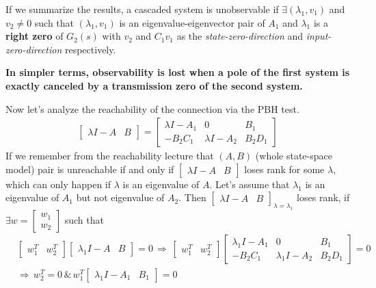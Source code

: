 \documentclass[twoside]{article}
\begin{document}
\begin{tcolorbox}[takeawaybox, title=Key Takeaway: Observability in Cascade]
If we summarize the results, a cascaded system is unobservable if $\exists (\lambda_1 , v_1)$ and $v_2 \neq 0$
such that $(\lambda_1 , v_1)$ is an eigenvalue-eigenvector pair of $A_1$ and $\lambda_1$ is a \textbf{right zero} of 
$G_2(s)$ with $v_2$ and $C_1 v_1$ as the \textit{state-zero-direction} and \textit{input-zero-direction} respectively. 

\vspace{2mm}
\textbf{In simpler terms, observability is lost when a pole of the first system is exactly canceled by a transmission zero of the second system.}
\end{tcolorbox}

Now let's analyze the reachability of the connection via the PBH test. 
%
\begin{align*}
	\left[ \begin{array}{c|c} \lambda I - A & B \end{array} \right]
	= 
	\left[ \begin{array}{c|c|c} \lambda I - A_1 & 0 & B_1 \\ \hline -B_2 C_1 & \lambda I - A_2 & B_2 D_1 
	\end{array} \right]
\end{align*}
%
If we remember from the reachability lecture that $(A,B)$ (whole state-space model) pair 
is unreachable if and only if $\left[ \begin{array}{c|c} \lambda I - A & B \end{array} \right]$
loses rank for some $\lambda$, which can only happen if $\lambda$ is an eigenvalue of $A$.
Let's assume that $\lambda_1$ is an eigenvalue of $A_1$ but not eigenvalue of $A_2$. 
Then $\left[ \begin{array}{c|c} \lambda I - A & B \end{array} \right]_{\lambda = \lambda_1}$ 
loses rank, if $\exists w = \begin{bmatrix} w_1 \\ w_2 \end{bmatrix}$ such that 
%
\begin{align*}
	&\begin{bmatrix} w_1^T & w_2^T \end{bmatrix} \left[ \begin{array}{c|c} \lambda_1 I - A & B \end{array} \right]
	= 0 \, \Rightarrow \, 
	\begin{bmatrix} w_1^T & w_2^T \end{bmatrix} \left[ \begin{array}{c|c|c} \lambda_1 I - A_1 & 0 & B_1 \\ \hline -B_2 C_1 & \lambda_1 I - A_2 & B_2 D_1 
	\end{array} \right] = 0
	\\
	&\Rightarrow \, w_2^T = 0 \, \& \, w_1^T \left[ \begin{array}{c|c} \lambda_1 I - A_1 & B_1 \end{array} \right] = 0
\end{align*}
\end{document}
